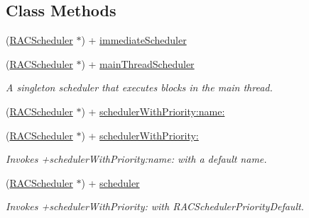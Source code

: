 \subsection*{Class Methods}
\begin{DoxyCompactItemize}
\item 
(\mbox{\hyperlink{interface_r_a_c_scheduler}{R\+A\+C\+Scheduler}} $\ast$) + \mbox{\hyperlink{interface_r_a_c_scheduler_aec2dc59d7f2bd10dc318429167154821}{immediate\+Scheduler}}
\item 
\mbox{\label{interface_r_a_c_scheduler_a2dd111b40041add1b0de13cd1fa99b5e}} 
(\mbox{\hyperlink{interface_r_a_c_scheduler}{R\+A\+C\+Scheduler}} $\ast$) + \mbox{\hyperlink{interface_r_a_c_scheduler_a2dd111b40041add1b0de13cd1fa99b5e}{main\+Thread\+Scheduler}}
\begin{DoxyCompactList}\small\item\em A singleton scheduler that executes blocks in the main thread. \end{DoxyCompactList}\item 
(\mbox{\hyperlink{interface_r_a_c_scheduler}{R\+A\+C\+Scheduler}} $\ast$) + \mbox{\hyperlink{interface_r_a_c_scheduler_a34b1d3a261fb95c3a52347f7204422d7}{scheduler\+With\+Priority\+:name\+:}}
\item 
\mbox{\label{interface_r_a_c_scheduler_aa10e4f49fd6084c122ebd21e16e3de29}} 
(\mbox{\hyperlink{interface_r_a_c_scheduler}{R\+A\+C\+Scheduler}} $\ast$) + \mbox{\hyperlink{interface_r_a_c_scheduler_aa10e4f49fd6084c122ebd21e16e3de29}{scheduler\+With\+Priority\+:}}
\begin{DoxyCompactList}\small\item\em Invokes +scheduler\+With\+Priority\+:name\+: with a default name. \end{DoxyCompactList}\item 
\mbox{\label{interface_r_a_c_scheduler_a5b62bfd8b2957365a9958b61a9cfaf83}} 
(\mbox{\hyperlink{interface_r_a_c_scheduler}{R\+A\+C\+Scheduler}} $\ast$) + \mbox{\hyperlink{interface_r_a_c_scheduler_a5b62bfd8b2957365a9958b61a9cfaf83}{scheduler}}
\begin{DoxyCompactList}\small\item\em Invokes +scheduler\+With\+Priority\+: with R\+A\+C\+Scheduler\+Priority\+Default. \end{DoxyCompactList}\item 

\end{DoxyCompactItemize}
